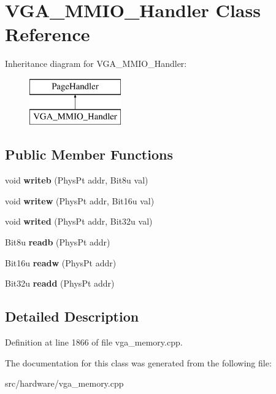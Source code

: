 \hypertarget{classVGA__MMIO__Handler}{\section{V\-G\-A\-\_\-\-M\-M\-I\-O\-\_\-\-Handler Class Reference}
\label{classVGA__MMIO__Handler}
}
Inheritance diagram for V\-G\-A\-\_\-\-M\-M\-I\-O\-\_\-\-Handler\-:\begin{figure}[H]
\begin{center}
\leavevmode
\includegraphics[height=2.000000cm]{classVGA__MMIO__Handler}
\end{center}
\end{figure}
\subsection*{Public Member Functions}
\begin{DoxyCompactItemize}
\item 
\hypertarget{classVGA__MMIO__Handler_ad50b71d3404bc469af03ff56d745e3a8}{void {\bfseries writeb} (Phys\-Pt addr, Bit8u val)}\label{classVGA__MMIO__Handler_ad50b71d3404bc469af03ff56d745e3a8}

\item 
\hypertarget{classVGA__MMIO__Handler_aa3e3785653f2764c24b7a815c0d2bd7d}{void {\bfseries writew} (Phys\-Pt addr, Bit16u val)}\label{classVGA__MMIO__Handler_aa3e3785653f2764c24b7a815c0d2bd7d}

\item 
\hypertarget{classVGA__MMIO__Handler_ac4bf7b683128264f52162cd970422707}{void {\bfseries writed} (Phys\-Pt addr, Bit32u val)}\label{classVGA__MMIO__Handler_ac4bf7b683128264f52162cd970422707}

\item 
\hypertarget{classVGA__MMIO__Handler_a84f44545ceb3036c10c93774b96364d7}{Bit8u {\bfseries readb} (Phys\-Pt addr)}\label{classVGA__MMIO__Handler_a84f44545ceb3036c10c93774b96364d7}

\item 
\hypertarget{classVGA__MMIO__Handler_a6946b527e6a8a6bb0971c7c8ea6f0cb4}{Bit16u {\bfseries readw} (Phys\-Pt addr)}\label{classVGA__MMIO__Handler_a6946b527e6a8a6bb0971c7c8ea6f0cb4}

\item 
\hypertarget{classVGA__MMIO__Handler_a8bc6f029559b7684a76741335d10d1f6}{Bit32u {\bfseries readd} (Phys\-Pt addr)}\label{classVGA__MMIO__Handler_a8bc6f029559b7684a76741335d10d1f6}

\end{DoxyCompactItemize}


\subsection{Detailed Description}


Definition at line 1866 of file vga\-\_\-memory.\-cpp.



The documentation for this class was generated from the following file\-:\begin{DoxyCompactItemize}
\item 
src/hardware/vga\-\_\-memory.\-cpp\end{DoxyCompactItemize}
